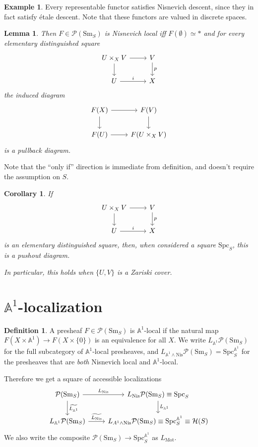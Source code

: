 \documentclass{shortart}
\newtheorem{lemma}[thm]{Lemma}
\newtheorem{cor}[thm]{Corollary}
\theoremstyle{definition}
\newtheorem{defi}[thm]{Definition}
\newtheorem{eg}[thm]{Example}
\newcommand\Sm{\mathrm{Sm}}
\newcommand\Spc{\mathrm{Spc}}
\newcommand\Nis{\mathrm{Nis}}
\newcommand\Pre{\mathcal{P}}
\renewcommand\H{\mathcal{H}}
\newcommand\A{\mathbb{A}}
\newcommand\Mot{\mathrm{Mot}}
\begin{document}
\begin{eg}
  Every representable functor satisfies Nisnevich descent, since they in fact satisfy \'etale descent. Note that these functors are valued in discrete spaces.
\end{eg}

\begin{lemma}
  Then $F \in \Pre(\Sm_S)$ is Nisnevich local iff $F(\emptyset) \simeq *$ and for every elementary distinguished square
  \[
    \begin{tikzcd}
      U \times_X V \ar[r] \ar[d] & V \ar[d, "p"]\\
      U \ar[r, "i"] & X
    \end{tikzcd}
  \]
  the induced diagram
  \[
    \begin{tikzcd}
      F(X) \ar[r] \ar[d] & F(V) \ar[d]\\
      F(U) \ar[r] & F(U \times_X V)
    \end{tikzcd}
  \]
  is a pullback diagram.
\end{lemma}
Note that the ``only if'' direction is immediate from definition, and doesn't require the assumption on $S$.

\begin{cor}
  If 
  \[
    \begin{tikzcd}
      U \times_X V \ar[r] \ar[d] & V \ar[d, "p"]\\
      U \ar[r, "i"] & X
    \end{tikzcd}
  \]
  is an elementary distinguished square, then, when considered a square $\Spc_S$, this is a pushout diagram.

  In particular, this holds when $\{U, V\}$ is a Zariski cover.
\end{cor}

\section{\texorpdfstring{$\A^1$}{A1}-localization}
\begin{defi}
  A presheaf $F \in \Pre(\Sm_S)$ is $\A^1$-local if the natural map $F(X \times \A^1) \to F(X \times \{0\})$ is an equivalence for all $X$. We write $L_{\A^1}\Pre(\Sm_S)$ for the full subcategory of $\A^1$-local presheaves, and $L_{\A^1 \wedge \Nis}\Pre(\Sm_S) = \Spc_S^{\A^1}$ for the presheaves that are \emph{both} Nisnevich local and $\A^1$-local.
\end{defi}
Therefore we get a square of accessible localizations
\[
  \begin{tikzcd}
    \Pre(\Sm_S) \ar[r, "L_{\Nis}"] \ar[d, "\widetilde{L_{\A^1}}"] & L_{\Nis} \Pre(\Sm_S) \equiv \Spc_S \ar[d, "L_{\A^1}"]\\
    L_{\A^1} \Pre(\Sm_S) \ar[r, "\widetilde{L_{\Nis}}"] & L_{A^1 \wedge \Nis} \Pre(\Sm_S) \equiv \Spc_S^{\A^1} \equiv \H(S)
  \end{tikzcd}
\]
We also write the composite $\Pre(\Sm_S) \to \Spc_S^{\A^1}$ as $L_{\Mot}$.
\end{document}
